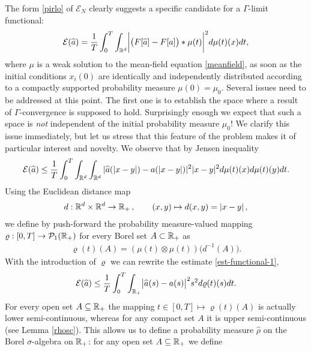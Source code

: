 The form \eqref{pirlo} of $\mathcal E_N$ clearly suggests a specific candidate for a $\Gamma$-limit functional:
\begin{align}\label{ourfunctional}
	\mathcal E(\widehat a)=\frac{1}{T}\int_0^T \int_{\mathbb{R}^d} \biggl|\bigl(F[\widehat a]-F[a]\bigr)\ast\mu(t)\biggr|^2d\mu(t)(x)dt,
\end{align}
where $\mu$ is a weak solution to the mean-field equation \eqref{meanfield}, as soon as the initial conditions $x_i(0)$ are identically and independently 
distributed according to a compactly supported probability measure $\mu(0)=\mu_0$. Several issues  need to be addressed at this point.
The first one is to establish the space where a result of $\Gamma$-convergence is supposed to hold. Surprisingly enough we expect that
such a space is {\it not} independent of the initial probability measure $\mu_0$! We clarify this issue immediately, but let us stress that this feature of the problem
makes it of particular interest and novelty. We observe that
by Jensen inequality
\begin{equation}\label{est-functional-1}
\mathcal E(\widehat a) \leq \frac{1}{T}\int_0^T  \int_{\mathbb{R}^d} \int_{\mathbb{R}^d}  | \widehat a(| x-y|) - a(| x-y|)|^2 | x-y|^2d \mu(t)(x) d \mu(t)(y) dt.
\end{equation}
Using the Euclidean distance map
\begin{align*}
	d:\mathbb{R}^d\times\mathbb{R}^d\rightarrow\mathbb{R}_+\,,\qquad (x,y)\mapsto d(x,y)=|x-y|\,,
\end{align*}
we define by push-forward the probability measure-valued mapping $\varrho:[0,T]\rightarrow \mathcal{P}_1(\mathbb{R}_+)$  for every Borel set $A\subset\mathbb{R}_+$ as
\begin{align*}
	\varrho(t)(A)=(\mu(t)\otimes\mu(t))\bigl(d^{-1}(A)\bigr).
\end{align*}
With the introduction of $\varrho$ we can rewrite the estimate \eqref{est-functional-1},
\begin{align}\label{midpoint1}
	\mathcal E(\widehat a)\leq \frac{1}{T}  \int_0^T\int_{\mathbb{R}_+}\bigl|\widehat a(s)-a(s)\bigr|^2 s^2d\varrho(t)(s) dt.
\end{align}
For every open set $A\subseteq\mathbb{R}_+$ the mapping $t \in [0,T] \mapsto\varrho(t)(A)$ is actually lower semi-continuous, whereas for
	any compact set $A$ it is upper semi-continuous (see Lemma \ref{rhosc}).
This allows us to define a probability measure $\widehat \rho$ on the Borel $\sigma$-algebra on $\mathbb{R}_+$: for any open set $A \subseteq \mathbb{R}_+$ we define
